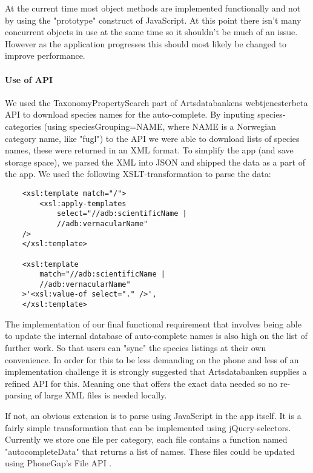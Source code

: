 At the current time most object methods are implemented functionally and not by
using the "prototype" construct of JavaScript.  At this point there isn't many
concurrent objects in use at the same time so it shouldn't be much of an issue.
However as the application progresses this should most likely be changed to
improve performance.

\paragraph{Use of API}\hspace{1mm}\newline

We used the TaxonomyPropertySearch part of Artsdatabankens webtjenesterbeta API
\cite{artsdatabanken:api-taxon-property-search} to download species names for
the auto-complete. By inputing species-categories (using speciesGrouping=NAME,
where NAME is a Norwegian category name, like "fugl") to the API we were able
to download lists of species names, these were returned in an XML format. To
simplify the app (and save storage space), we parsed the XML into JSON and
shipped the data as a part of the app. We used the following
XSLT-transformation to parse the data:

\begin{lstlisting}
	<xsl:template match="/">
		<xsl:apply-templates 
			select="//adb:scientificName | 
			//adb:vernacularName" 
	/>
	</xsl:template>

	<xsl:template 
		match="//adb:scientificName | 
		//adb:vernacularName"
	>'<xsl:value-of select="." />',
	</xsl:template>
\end{lstlisting}

The implementation of our final functional requirement that involves being able to update
the internal database of auto-complete names is also high on the list of further work.
So that users can "sync" the species listings at their own convenience.
In order for this to be less demanding on the phone and less of an implementation challenge it is strongly suggested that Artsdatabanken supplies a refined API for this.
Meaning one that offers the exact data needed so no re-parsing of large XML files is needed locally.

If not, an obvious extension is to parse using JavaScript in the app itself. It is a
fairly simple transformation that can be implemented using jQuery-selectors.
Currently we store one file per category, each file contains a function named
"autocompleteData" that returns a list of names.
These files could be updated using PhoneGap's File API \cite{phonegap:api-file}.

